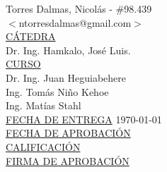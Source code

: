 \documentclass[a4paper,12pt]{article}
\numberwithin{equation}{section}
\numberwithin{figure}{section}
\begin{document}
\begin{titlepage}
\begin{tabbing}
		Torres Dalmas, Nicolás	\>\>- \#98.439\\
		\>\footnotesize{$<$ntorresdalmas@gmail.com$>$}\\
		
		\<\underline{CÁTEDRA}\\[0.2cm]
		Dr. Ing. Hamkalo, José Luis. \\
		
		\<\underline{CURSO}\\[0.2cm]
		Dr. Ing. Juan Heguiabehere \\
		Ing. Tomás Niño Kehoe \\
		 Ing. Matías Stahl \\[1cm]
		
		\<\underline{FECHA DE ENTREGA}\>\>\> \today
		\\[0.2cm]
		
		\<\underline{FECHA DE APROBACIÓN}\>\>\> 
		\\[0.2cm]
		
		\<\underline{CALIFICACIÓN}\>\>\> 
		\\[0.2cm]
		
		\<\underline{FIRMA DE APROBACIÓN}
		\\[0.5cm]
		
	\end{tabbing}
	
	
	
	
\end{titlepage}

\clearpage

\tableofcontents							

\clearpage

\end{document}
